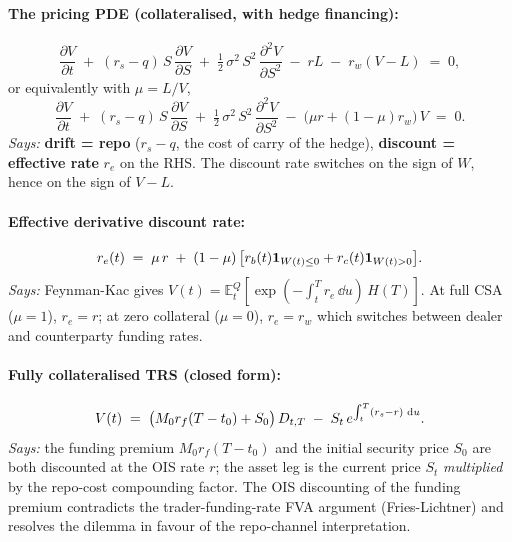 \documentclass[11pt,a4paper]{article}
\begin{document}
\paragraph{The pricing PDE (collateralised, with hedge financing):}
\begin{equation}\label{eq:lou-pde}
  \frac{\partial V}{\partial t}
  \;+\; (r_s - q)\, S\, \frac{\partial V}{\partial S}
  \;+\; \tfrac{1}{2}\, \sigma^2\, S^2\, \frac{\partial^2 V}{\partial S^2}
  \;-\; r L \;-\; r_w (V - L) \;=\; 0,
\end{equation}
or equivalently with $\mu = L/V$,
\begin{equation}\label{eq:lou-pde-mu}
  \frac{\partial V}{\partial t}
  \;+\; (r_s - q)\, S\, \frac{\partial V}{\partial S}
  \;+\; \tfrac{1}{2}\, \sigma^2\, S^2\, \frac{\partial^2 V}{\partial S^2}
  \;-\; \bigl(\mu r + (1 - \mu) r_w\bigr)\, V \;=\; 0.
\end{equation}
\textit{Says:} \textbf{drift = repo} ($r_s - q$, the cost of carry of
the hedge), \textbf{discount = effective rate} $r_e$ on the RHS. The
discount rate switches on the sign of $W$, hence on the sign of
$V - L$.

\paragraph{Effective derivative discount rate:}
\begin{equation}\label{eq:lou-re}
  r_e(t) \;=\; \mu\, r \;+\; (1 - \mu)\, \bigl[r_b(t) \mathbf{1}_{W(t) \le 0} + r_c(t) \mathbf{1}_{W(t) > 0}\bigr].
\end{equation}
\textit{Says:} Feynman-Kac gives $V(t) = \mathbb{E}^Q_t[\exp(-\int_t^T r_e\,\dd u)\, H(T)]$.
At full CSA ($\mu = 1$), $r_e = r$; at zero collateral ($\mu = 0$),
$r_e = r_w$ which switches between dealer and counterparty
funding rates.

\paragraph{Fully collateralised TRS (closed form):}
\begin{equation}\label{eq:lou-V-full}
  V(t) \;=\; \bigl( M_0 r_f (T - t_0) + S_0 \bigr)\, D_{t,T}
            \;-\; S_t\, e^{\int_t^T (r_s - r)\,\,\mathrm{d} u}.
\end{equation}
\textit{Says:} the funding premium $M_0 r_f (T - t_0)$ and the
initial security price $S_0$ are both discounted at the OIS rate
$r$; the asset leg is the current price $S_t$ \emph{multiplied} by
the repo-cost compounding factor. The OIS discounting of the funding
premium contradicts the trader-funding-rate FVA argument
(Fries-Lichtner) and resolves the dilemma in favour of the
repo-channel interpretation.
\end{document}
